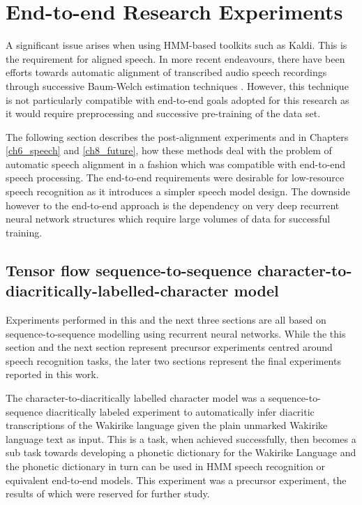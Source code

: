 \section{End-to-end Research Experiments}\label{sec_postalign}
A significant issue arises when using HMM-based toolkits such as Kaldi.  This is the requirement for aligned speech.  In more recent endeavours, there have been efforts towards automatic alignment of transcribed audio speech recordings through successive Baum-Welch estimation techniques \cite{gales2014speech,ragni2018automatic,ragni2014data}. However, this technique is not particularly compatible with end-to-end goals adopted for this research as it would require preprocessing and successive pre-training of the data set.

The following section describes the post-alignment experiments and in Chapters \ref{ch6_speech} and \ref{ch8_future}, how these methods deal with the problem of automatic speech alignment in a fashion which was compatible with end-to-end speech processing.  The end-to-end requirements were desirable for low-resource speech recognition as it introduces a simpler speech model design.  The downside however to the end-to-end approach is the dependency on very deep recurrent neural network structures which require large volumes of data for successful training.

\subsection{Tensor flow sequence-to-sequence character-to-diacritically-labelled-character model}\label{sec_c2d}
Experiments performed in this and the next three sections are all based on sequence-to-sequence modelling using recurrent neural networks.  While the this section and the next section represent precursor experiments centred around speech recognition tasks, the later two sections represent the final experiments reported in this work.

The character-to-diacritically labelled character model was a sequence-to-sequence diacritically labeled experiment to automatically infer diacritic transcriptions of the Wakirike language given the plain unmarked Wakirike language text as input.  This is a task, when achieved successfully, then becomes a sub task towards developing a phonetic dictionary for the Wakirike Language and the phonetic dictionary in turn can be used in HMM speech recognition or equivalent  end-to-end models.  This experiment was a precursor experiment, the results of which were reserved for further study.

